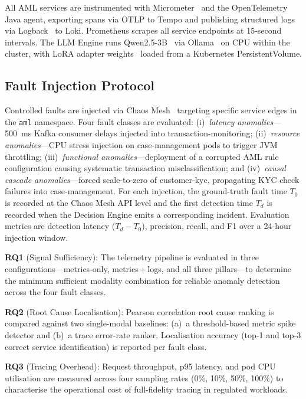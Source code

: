 \documentclass[a4paper,anonymous,UKenglish]{lipics-v2021}
\begin{document}
All AML services are instrumented with Micrometer~\cite{micrometer2018} and the
OpenTelemetry Java agent, exporting spans via OTLP to Tempo and publishing
structured logs via Logback~\cite{logback2006} to Loki. Prometheus scrapes all
service endpoints at 15-second intervals. The LLM Engine runs
Qwen2.5-3B~\cite{qwen2024} via Ollama~\cite{ollama2023} on CPU within the
cluster, with LoRA adapter weights~\cite{hu2022lora} loaded from a Kubernetes
PersistentVolume.

\subsection{Fault Injection Protocol}

Controlled faults are injected via Chaos Mesh~\cite{chaosmesh2020} targeting
specific service edges in the \texttt{aml} namespace. Four fault classes are
evaluated: (i)~\textit{latency anomalies}---500~ms Kafka consumer delays
injected into transaction-monitoring; (ii)~\textit{resource anomalies}---CPU
stress injection on case-management pods to trigger JVM throttling;
(iii)~\textit{functional anomalies}---deployment of a corrupted AML rule
configuration causing systematic transaction misclassification; and
(iv)~\textit{causal cascade anomalies}---forced scale-to-zero of customer-kyc,
propagating KYC check failures into case-management. For each injection, the
ground-truth fault time $T_0$ is recorded at the Chaos Mesh API level and the
first detection time $T_d$ is recorded when the Decision Engine emits a
corresponding incident. Evaluation metrics are detection latency ($T_d - T_0$),
precision, recall, and F1 over a 24-hour injection window.

\textbf{RQ1} (Signal Sufficiency): The telemetry pipeline is evaluated in three
configurations---metrics-only, metrics\,+\,logs, and all three
pillars---to determine the minimum sufficient modality combination for reliable
anomaly detection across the four fault classes.

\textbf{RQ2} (Root Cause Localisation): Pearson correlation root cause ranking
is compared against two single-modal baselines: (a)~a threshold-based metric
spike detector and (b)~a trace error-rate ranker. Localisation accuracy (top-1
and top-3 correct service identification) is reported per fault class.

\textbf{RQ3} (Tracing Overhead): Request throughput, p95 latency, and pod CPU
utilisation are measured across four sampling rates (0\%, 10\%, 50\%, 100\%)
to characterise the operational cost of full-fidelity tracing in regulated
workloads.
\end{document}
